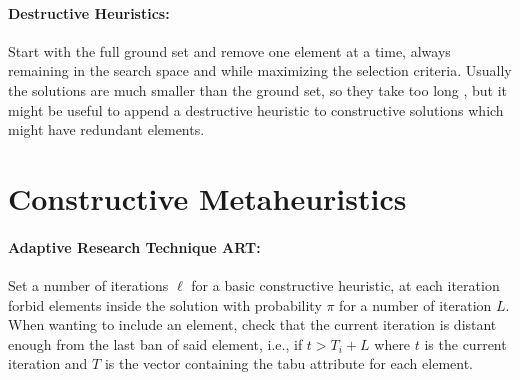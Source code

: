 \documentclass{article}
\begin{document}
	\paragraph{Destructive Heuristics:} Start with the full ground set and remove one element at a time, always remaining in the search space and while maximizing the selection criteria. Usually the solutions are much smaller than the ground set, so they take too long , but it might be useful to append a destructive heuristic to constructive solutions which might have redundant elements.\\
	
	\section*{Constructive Metaheuristics}
	
	\paragraph{Adaptive Research Technique ART:} Set a number of iterations $\ell$ for a basic constructive heuristic, at each iteration forbid elements inside the solution with probability $\pi$ for a number of iteration $L$. When wanting to include an element, check that the current iteration is distant enough from the last ban of said element, i.e., if $t > T_i + L$ where $t$ is the current iteration and $T$ is the vector containing the tabu attribute for each element.\\
	
\end{document}

